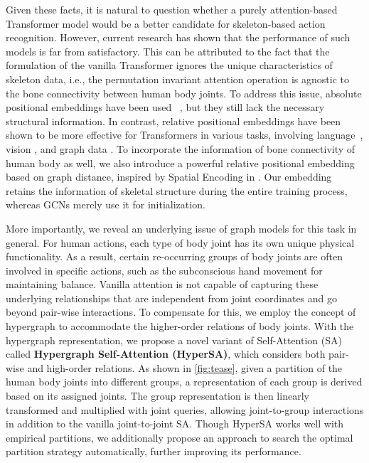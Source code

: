 \documentclass[10pt,twocolumn,letterpaper]{article}
\begin{document}
Given these facts, it is natural to question whether a purely attention-based Transformer model would be a better candidate for skeleton-based action recognition. However, current research \cite{plizzari2021spatial, shi2020decoupled} has shown that the performance of such models is far from satisfactory. This can be attributed to the fact that the formulation of the vanilla Transformer ignores the unique characteristics of skeleton data, i.e., 
the permutation invariant attention operation is agnostic to the bone connectivity between human body joints. To address this issue, absolute positional embeddings have been used~\cite{vaswani2017attention, dosovitskiy2021an, touvron2021training} , but they still lack the necessary structural information. In contrast, relative positional embeddings have been shown to be more effective for Transformers in various tasks, involving language~\cite{shaw2018self, dai2019transformer, he2020deberta}, vision \cite{liu2021swin, zhou2022sp, wu2021rethinking, zhou2022sp}, and graph data \cite{ying2021transformers}. To incorporate the information of bone connectivity of human body as well, we  also introduce a powerful relative positional embedding based on graph distance, inspired by Spatial Encoding in \cite{ying2021transformers}. Our embedding retains the information of skeletal structure during the entire training process, whereas GCNs merely use it for initialization. 

More importantly, we reveal an underlying issue of graph models for this task in general.
For human actions, each type of body joint has its own unique physical functionality. As a result, certain re-occurring groups of body joints are often involved in specific actions, such as the subconscious hand movement for maintaining balance. 
Vanilla attention is not capable of capturing these underlying relationships that are independent from joint coordinates and go beyond pair-wise interactions. 
To compensate for this, we employ the concept of hypergraph \cite{zhou2006learning, feng2019hypergraph, bai2021hypergraph} to accommodate the higher-order relations of body joints. With the hypergraph representation, we propose a novel variant of Self-Attention (SA) called \textbf{Hypergraph Self-Attention (HyperSA)}, which considers both pair-wise and high-order relations. As shown in \cref{fig:tease}, given a partition of the human body joints into different groups, a representation of each group is derived based on its assigned joints. The group representation is then linearly transformed and multiplied with joint queries, allowing joint-to-group interactions in addition to the vanilla joint-to-joint SA. 
Though HyperSA works well with empirical partitions, we additionally propose an approach to search the optimal partition strategy automatically, further improving its performance.
\end{document}
